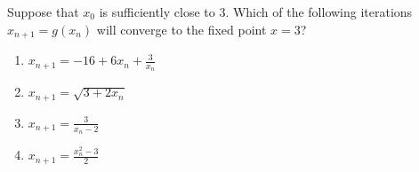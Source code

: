 \item Suppose that \( x_0 \) is sufficiently close to 3. Which of the following iterations \( x_{n+1} = g(x_n) \) will converge to the fixed point \( x = 3 \)?
\begin{enumerate}
    \item $x_{n+1} = -16 + 6x_n + \frac{3}{x_n}$
    
    \item $x_{n+1} = \sqrt{3 + 2x_n}$
    
    \item $x_{n+1} = \frac{3}{x_n - 2}$
    
    \item $x_{n+1} = \frac{x_n^2 - 3}{2}$
\end{enumerate}


